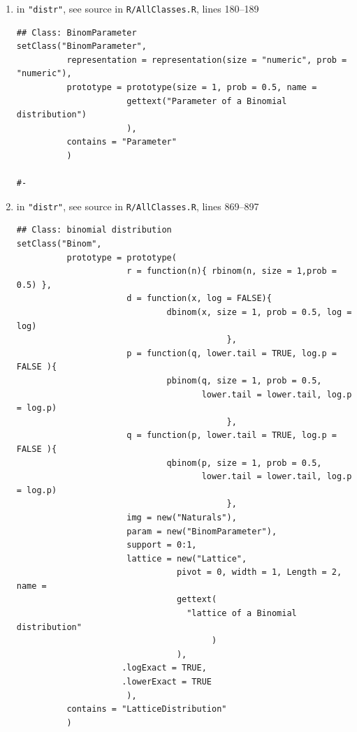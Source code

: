 \documentclass[10pt]{article}
\def\file#1{{\tt #1}}
\def\pkg#1{{\tt "#1"}}
\begin{document}
\begin{enumerate}
%
\item in \pkg{distr}, see source in \file{R/AllClasses.R},  
%
lines 180--189
\Rlstset
\begin{lstlisting}
## Class: BinomParameter
setClass("BinomParameter", 
          representation = representation(size = "numeric", prob = "numeric"), 
          prototype = prototype(size = 1, prob = 0.5, name = 
                      gettext("Parameter of a Binomial distribution")
                      ), 
          contains = "Parameter"
          )

#-
\end{lstlisting}
\item in \pkg{distr}, see source in \file{R/AllClasses.R},  
%
lines 869--897
\Rlstset
\begin{lstlisting}
## Class: binomial distribution
setClass("Binom",
          prototype = prototype(
                      r = function(n){ rbinom(n, size = 1,prob = 0.5) },
                      d = function(x, log = FALSE){
                              dbinom(x, size = 1, prob = 0.5, log = log)
                                          },
                      p = function(q, lower.tail = TRUE, log.p = FALSE ){
                              pbinom(q, size = 1, prob = 0.5,
                                     lower.tail = lower.tail, log.p = log.p)
                                          },
                      q = function(p, lower.tail = TRUE, log.p = FALSE ){
                              qbinom(p, size = 1, prob = 0.5,
                                     lower.tail = lower.tail, log.p = log.p)
                                          },
                      img = new("Naturals"),
                      param = new("BinomParameter"),
                      support = 0:1,
                      lattice = new("Lattice",
                                pivot = 0, width = 1, Length = 2, name =
                                gettext(
                                  "lattice of a Binomial distribution"
                                       )
                                ),
                     .logExact = TRUE,
                     .lowerExact = TRUE
                      ),
          contains = "LatticeDistribution"
          )
\end{lstlisting}

\end{enumerate}
\end{document}
